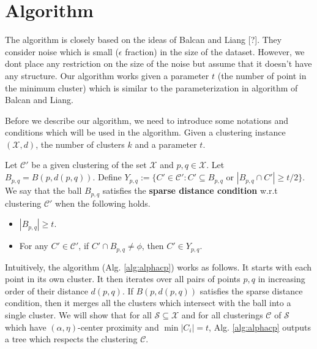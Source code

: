 \documentclass[11pt]{article}
\newcommand{\mc}{\mathcal}
\begin{document}
\section{Algorithm}
The algorithm is closely based on the ideas of Balcan and Liang [?]. They consider noise which is small ($\epsilon$ fraction) in the size of the dataset. However, we dont place any restriction on the size of the noise but assume that it doesn't have any structure. Our algorithm works given a parameter $t$ (the number of point in the minimum cluster) which is similar to the parameterization in algorithm of Balcan and Liang.

Before we describe our algorithm, we need to introduce some notations and conditions which will be used in the algorithm. Given a clustering instance $(\mc X, d)$, the number of clusters $k$ and a parameter $t$.

Let $\mc C'$ be a given clustering of the set $\mc X$ and $p, q \in \mc X$. Let $B_{p,q} = B(p, d(p, q))$. Define $Y_{p,q} := \{C' \in \mc C' : C' \subseteq B_{p,q} \text{ or } |B_{p,q} \cap C'| \ge t/2\}$. 
We say that the ball $B_{p,q}$ satisfies the \textbf{sparse distance condition} w.r.t clustering $\mc C'$ when the following holds.
\begin{itemize}[noitemsep, leftmargin=*]
\item $|B_{p,q}| \ge t$.
\item For any $C' \in \mc C'$, %
if $C' \cap B_{p,q} \neq \phi$, then $C' \in Y_{p,q}$.
\end{itemize}

Intuitively, the algorithm (Alg. \ref{alg:alphacp}) works as follows. It starts with each point in its own cluster. It then iterates over all pairs of points $p, q$ in increasing order of their distance $d(p, q)$. If $B(p, d(p,q))$ satisfies the sparse distance condition, then it merges all the clusters which intersect with the ball into a single cluster. We will show that for all $\mc S \subseteq \mc X$ and for all clusterings $\mc C$ of $\mc S$ which have $(\alpha, \eta)$-center proximity and $\min |C_i| = t$, Alg. \ref{alg:alphacp} outputs a tree which respects the clustering $\mc C$.
\end{document}
